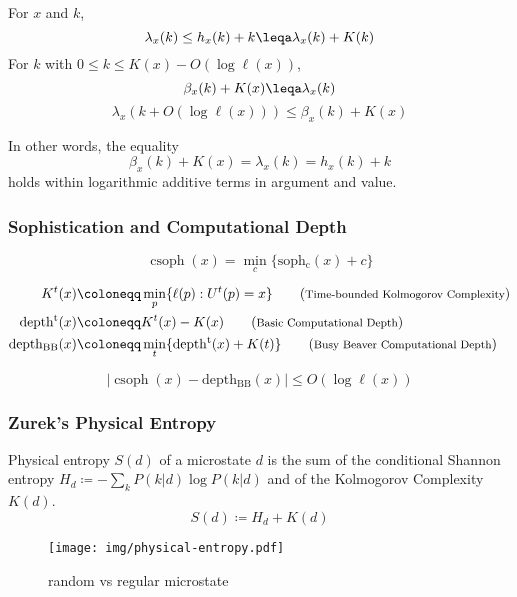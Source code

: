 \documentclass[UTF8,11pt,colorlinks,compress,openany]{beamer}%
\begin{document}
\begin{frame}\frametitle{}
\begin{theorem}
For $x$ and $k$,
\[\lambda_x(k)\leq h_x(k)+k\leqa\lambda_x(k)+K(k)\]
For $k$ with $0\leq k\leq K(x)-O(\log\ell(x))$,
\[\beta_x(k)+K(x)\leqa\lambda_x(k)\]
\[\lambda_x(k+O(\log \ell(x)))\leq\beta_x(k)+K(x)\]
\end{theorem}
In other words, the equality
\[\beta_x(k)+K(x)=\lambda_x(k)=h_x(k)+k\]
holds within logarithmic additive terms in argument and value.
\end{frame}

\begin{frame}\frametitle{Sophistication and Computational Depth}
\begin{theorem}
\[\operatorname{csoph}(x)=\min\limits_c\{\operatorname{soph_c}(x)+c\}\]
\end{theorem}
\begin{align*}
K^t(x)&\coloneqq \min\limits_p\{\ell(p): U^t(p)=x\}\tag{\text{\footnotesize Time-bounded Kolmogorov Complexity}}\\
\operatorname{depth^t}(x)&\coloneqq K^t(x)-K(x)\tag{\text{\footnotesize Basic Computational Depth}}\\
\operatorname{depth_{BB}}(x)&\coloneqq \min\limits_t\{\operatorname{depth^t}(x)+K(t)\}\tag{\text{\footnotesize Busy Beaver Computational Depth}}
\end{align*}
\begin{theorem}
\[|\operatorname{csoph}(x)-\operatorname{depth_{BB}}(x)|\leq O(\log \ell(x))\]
\end{theorem}
\end{frame}

\begin{frame}\frametitle{Zurek's Physical Entropy}
\setlength\abovedisplayskip{0pt}
\setlength\belowdisplayskip{0pt}
\begin{definition}
Physical entropy $S(d)$ of a microstate $d$ is the sum of the conditional Shannon entropy $H_d\coloneqq -\sum\limits_k P(k|d)\log P(k|d)$ and of the Kolmogorov Complexity $K(d)$.
\[S(d)\coloneqq H_d+K(d)\]
\end{definition}
\begin{figure}[H]
	\begin{center}
		\texttt{[image: img/physical-entropy.pdf]}\caption{random vs regular microstate}
	\end{center}
\end{figure}
\end{frame}
\end{document}
